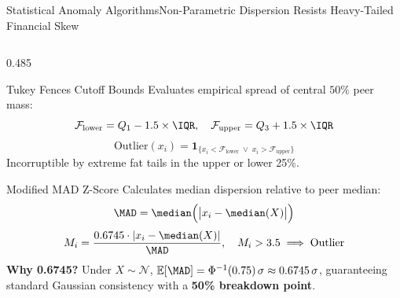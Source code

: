 \begin{frame}{Statistical Anomaly Algorithms}{Non-Parametric Dispersion Resists Heavy-Tailed Financial Skew}
\begin{columns}[T,onlytextwidth]
        \begin{column}{0.485\textwidth}
            \begin{mathcard}[height=2.7cm]{Tukey Fences Cutoff Bounds}
                \fontsize{6.3pt}{8pt}\selectfont
                Evaluates empirical spread of central $50\%$ peer mass:
                \begin{equation*}
                    \mathcal{F}_{\text{lower}} = Q_1 - 1.5 \times \IQR, \quad \mathcal{F}_{\text{upper}} = Q_3 + 1.5 \times \IQR
                \end{equation*}
                \begin{equation*}
                    \text{Outlier}(x_i) = \mathbf{1}_{\{x_i < \mathcal{F}_{\text{lower}} \;\lor\; x_i > \mathcal{F}_{\text{upper}}\}}
                \end{equation*}
                Incorruptible by extreme fat tails in the upper or lower 25\%.
            \end{mathcard}

            \vspace{0.1cm}

            \begin{mathcard}[height=2.75cm]{Modified MAD Z-Score}
                \fontsize{6.1pt}{7.7pt}\selectfont
                Calculates median dispersion relative to peer median:
                \begin{equation*}
                    \MAD = \median\Big(\big|x_i - \median(X)\big|\Big)
                \end{equation*}
                \begin{equation*}
                    M_i = \frac{0.6745 \cdot |x_i - \median(X)|}{\MAD}, \quad M_i > 3.5 \implies \text{Outlier}
                \end{equation*}
                \textbf{\color{deepemerald}Why 0.6745?} Under $X \sim \mathcal{N}$, $\mathbb{E}[\MAD] = \Phi^{-1}(0.75)\,\sigma \approx 0.6745\,\sigma$, guaranteeing standard Gaussian consistency with a \textbf{50\% breakdown point}.
            \end{mathcard}
        \end{column}
    \end{columns}

    \vspace{0.1cm}
    \hfill {}
\end{frame}

